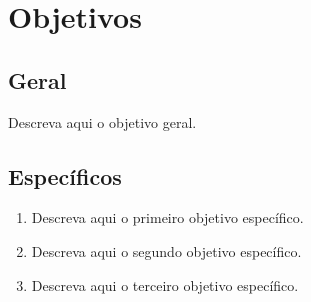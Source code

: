 \section{Objetivos}
\label{sec:objetivos}

\subsection{Geral}
\label{sec:objetivo-geral}


Descreva aqui o objetivo geral.

\subsection{Específicos}
\label{sec:objetivos-especificos}


\begin{enumerate}
  \item Descreva aqui o primeiro objetivo específico.
  \item Descreva aqui o segundo objetivo específico.
  \item Descreva aqui o terceiro objetivo específico.
\end{enumerate}
